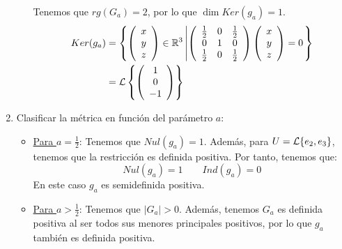 \begin{ejercicio}
\begin{enumerate}
\begin{itemize}
            Tenemos que $rg(G_a)=2$, por lo que $\dim Ker(g_a) = 1$.
            \begin{equation*}
                \begin{split}
                    Ker(g_a) &= \left\{\left(\begin{array}{c}
                        x \\ y \\ z
                    \end{array}\right)\in \mathbb{R}^3 \left|
                    \left(\begin{array}{ccc}
                        \frac{1}{2} & 0 & \frac{1}{2} \\
                        0 & 1 & 0 \\
                        \frac{1}{2} & 0 & \frac{1}{2}
                    \end{array}\right)
                    \left(\begin{array}{c}
                        x \\ y \\ z
                    \end{array}\right) = 0
                    \right.\right\} \\
                    &= \mathcal{L}\left\{\left(\begin{array}{c}
                        1 \\ 0 \\ -1
                    \end{array}\right)\right\}
                \end{split}
            \end{equation*}
        \end{itemize}

        \item Clasificar la métrica en función del parámetro $a$:
        \begin{itemize}
            \item \underline{Para $a=\frac{1}{2}$}: Tenemos que $Nul(g_a)=1$. Además, para $U=\mathcal{L}\{e_2, e_3\}$, tenemos que la restricción es definida positiva. Por tanto, tenemos que:
            \begin{equation*}
                Nul(g_a)=1 \qquad Ind(g_a)=0
            \end{equation*}
            En este caso $g_a$ es semidefinida positiva.

            \item \underline{Para $a>\frac{1}{2}$}: Tenemos que $|G_a|>0$. Además, tenemos $G_a$ es definida positiva al ser todos sus menores principales positivos, por lo que $g_a$ también es definida positiva.


\end{itemize}
\end{enumerate}
\end{ejercicio}
